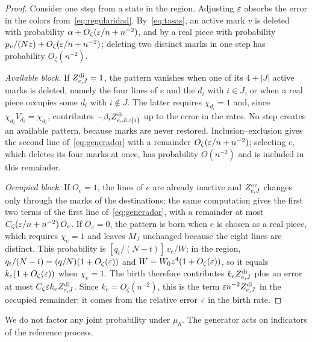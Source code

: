 \begin{proof} Consider one step from a state in the region. Adjusting $\varepsilon$ absorbs the error in the colors
from~\eqref{eq:regularidad}. By~\eqref{eq:tasas}, an active mark $v$ is deleted with probability
$\alpha+O_\zeta(\varepsilon/n+n^{-2})$, and
by a real piece with probability $p_v/(Nz)+O_\zeta(\varepsilon/n+n^{-2})$; deleting two distinct marks in one step
has probability
$O_\zeta(n^{-2})$.

\emph{Available block.} If $Z^{\mathrm{di}}_{e,J}=1$, the pattern vanishes when one of its $4+|J|$ active marks is
deleted, namely the four
lines of $e$ and the $d_i$ with $i\in J$, or when a real piece occupies some $d_i$ with $i\notin J$. The
latter requires
$\chi_{d_i}=1$ and, since $\chi_{d_i}V_{d_i}=\chi_{d_i}$, contributes $-\beta_iZ^{\mathrm{di}}_{e,J\cup\{i\}}$ up to
the error in the rates.
No step creates an available pattern, because marks are never restored. Inclusion--exclusion gives the
second line
of~\eqref{eq:generador} with a remainder $O_\zeta(\varepsilon/n+n^{-2})$; selecting $e$, which deletes its four
marks at once, has
probability $O(n^{-2})$ and is included in this remainder.

\emph{Occupied block.} If $O_e=1$, the lines of $e$ are already inactive and $Z^{\mathrm{oc}}_{e,J}$ changes only
through the marks of the
destinations; the same computation gives the first two terms of the first line of~\eqref{eq:generador}, with
a remainder at most
$C_\zeta(\varepsilon/n+n^{-2})\,O_e$. If $O_e=0$, the pattern is born when $e$ is chosen as a real piece, which
requires $\chi_e=1$ and
leaves $M_J$ unchanged because the eight lines are distinct. This probability is $[q_t/(N-t)]\,v_e/W$; in
the region,
$q_t/(N-t)=(q/N)(1+O_\zeta(\varepsilon))$ and $W=W_0z^4(1+O_\zeta(\varepsilon))$, so it equals $k_e(1+O_\zeta(\varepsilon))$ when
$\chi_e=1$. The birth
therefore contributes $k_eZ^{\mathrm{di}}_{e,J}$ plus an error at most $C_\zeta\varepsilon k_eZ^{\mathrm{di}}_{e,J}$. Since
$k_e=O_\zeta(n^{-2})$, this is the
term $\varepsilon n^{-2}Z^{\mathrm{di}}_{e,J}$ in the occupied remainder: it comes from the relative error $\varepsilon$ in the
birth rate. \end{proof}

We do not factor any joint probability under $\mu_h$. The generator acts on indicators of the reference
process.
